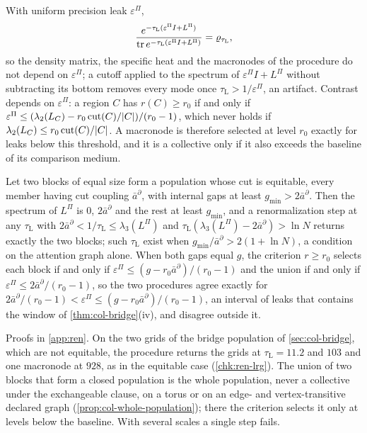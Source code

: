 \begin{proposition}\label{prop:ren-lrg}
With uniform precision leak $\varepsilon^\Pi$,
\[
\frac{e^{-\tau_{\mathrm L}(\varepsilon^\Pi I+L^\Pi)}}{\operatorname{tr} e^{-\tau_{\mathrm L}(\varepsilon^\Pi I+L^\Pi)}}=\varrho_{\tau_{\mathrm L}},
\]
so the density matrix, the specific heat and the macronodes of the procedure do not depend on $\varepsilon^\Pi$; a cutoff applied to the spectrum of $\varepsilon^\Pi I+L^\Pi$ without subtracting its bottom removes every mode once $\tau_{\mathrm L}>1/\varepsilon^\Pi$, an artifact. Contrast depends on $\varepsilon^\Pi$: a region $C$ has $r(C)\ge r_0$ if and only if $\varepsilon^\Pi\le(\lambda_2(L_C)-r_0\operatorname{cut}(C)/\lvert C\rvert)/(r_0-1)$, which never holds if $\lambda_2(L_C)\le r_0\operatorname{cut}(C)/\lvert C\rvert$. A macronode is therefore selected at level $r_0$ exactly for leaks below this threshold, and it is a collective only if it also exceeds the baseline of its comparison medium.
\end{proposition}

\begin{proposition}\label{prop:ren-lrg-agreement}
Let two blocks of equal size form a population whose cut is equitable, every member having cut coupling $\bar a^\partial$, with internal gaps at least $g_{\min}>2\bar a^\partial$. Then the spectrum of $L^\Pi$ is $0$, $2\bar a^\partial$ and the rest at least $g_{\min}$, and a renormalization step at any $\tau_{\mathrm L}$ with $2\bar a^\partial<1/\tau_{\mathrm L}\le\lambda_3(L^\Pi)$ and $\tau_{\mathrm L}(\lambda_3(L^\Pi)-2\bar a^\partial)>\ln N$ returns exactly the two blocks; such $\tau_{\mathrm L}$ exist when $g_{\min}/\bar a^\partial>2(1+\ln N)$, a condition on the attention graph alone. When both gaps equal $g$, the criterion $r\ge r_0$ selects each block if and only if $\varepsilon^\Pi\le(g-r_0\bar a^\partial)/(r_0-1)$ and the union if and only if $\varepsilon^\Pi\le2\bar a^\partial/(r_0-1)$, so the two procedures agree exactly for $2\bar a^\partial/(r_0-1)<\varepsilon^\Pi\le(g-r_0\bar a^\partial)/(r_0-1)$, an interval of leaks that contains the window of \cref{thm:col-bridge}(iv), and disagree outside it.
\end{proposition}
Proofs in \cref{app:ren}. On the two grids of the bridge population of \cref{sec:col-bridge}, which are not equitable, the procedure returns the grids at $\tau_{\mathrm L}=11.2$ and $103$ and one macronode at $928$, as in the equitable case (\cref{chk:ren-lrg}). The union of two blocks that form a closed population is the whole population, never a collective under the exchangeable clause, on a torus or on an edge- and vertex-transitive declared graph (\cref{prop:col-whole-population}); there the criterion selects it only at levels below the baseline. With several scales a single step fails.

